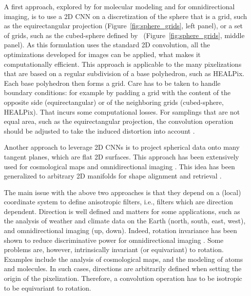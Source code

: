 \documentclass[final,twocolumn,3p,times,sort&compress]{elsarticle}
\newcommand{\figref}[1]{Figure~\ref{fig:#1}}
\newcommand{\1}{\b{1}}              %
\newcommand{\0}{\b{0}}              %
\begin{document}
A first approach, explored by \citep{boomsma2017spherical} for molecular modeling and \citep{su2017sphericalconv, coors2018spherenet} for omnidirectional imaging, is to use a 2D CNN on a discretization of the sphere that is a grid, such as the equirectangular projection (\figref{sphere_grids}, left panel), or a set of grids, such as the cubed-sphere defined by~\citep{ronchi1996cubed} (\figref{sphere_grids},  middle panel).
As this formulation uses the standard 2D convolution, all the optimizations developed for images can be applied, what makes it computationally efficient.
This approach is applicable to the many pixelizations that are based on a regular subdivision of a base polyhedron, such as HEALPix. Each base polyhedron then forms a grid.
Care has to be taken to handle boundary conditions: for example by padding a grid with the content of the opposite side (equirectangular) or of the neighboring grids (cubed-sphere, HEALPix). That incurs some computational losses.
For samplings that are not equal area, such as the equirectangular projection, the convolution operation should be adjusted to take the induced distortion into account \citep{su2017sphericalconv, coors2018spherenet}.

Another approach to leverage 2D CNNs is to project spherical data onto many tangent planes, which are flat 2D surfaces.
This approach has been extensively used for cosmological maps \citep{fluri2018deep, gupta2018nongaussianinformation, schmelze2017cosmologicalmodel, gillet2018deeplearning} and omnidirectional imaging \citep{xiao2012recognizing, zhang2014panocontext}.
This idea has been generalized to arbitrary 2D manifolds for shape alignment and retrieval \citep{masci2015gcnn, boscaini2016acnn, monti2017monet}.

The main issue with the above two approaches is that they depend on a (local) coordinate system to define anisotropic filters, i.e., filters which are direction dependent.
Direction is well defined and matters for some applications, such as the analysis of weather and climate data on the Earth (north, south, east, west), and omnidirectional imaging (up, down).
Indeed, rotation invariance has been shown to reduce discriminative power for omnidirectional imaging \citep{coors2018spherenet}.
Some problems are, however, intrinsically invariant (or equivariant) to rotation.
Examples include the analysis of cosmological maps, and the modeling of atoms and molecules.
In such cases, directions are arbitrarily defined when setting the origin of the pixelization.
Therefore, a convolution operation has to be isotropic to be equivariant to rotation.
\end{document}
